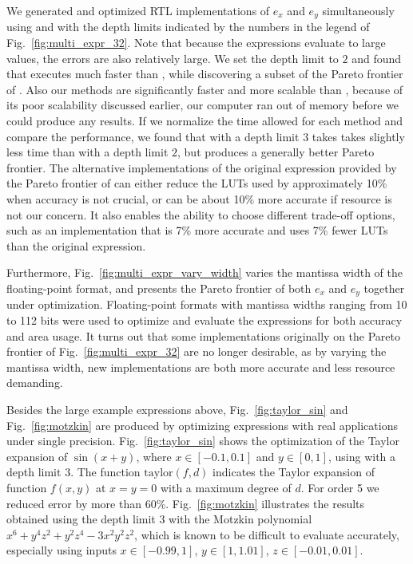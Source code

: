 We generated and optimized RTL implementations of $e_x$ and $e_y$
simultaneously using \frontiertrace{} and \greedytrace{} with the depth limits
indicated by the numbers in the legend of Fig.~\ref{fig:multi_expr_32}. Note
that because the expressions evaluate to large values, the errors are also
relatively large. We set the depth limit to $2$ and found that \greedytrace{}
executes much faster than \frontiertrace{}, while discovering a subset of
the Pareto frontier of \frontiertrace{}. Also our methods are significantly
faster and more scalable than \marteltrace{}, because of its poor scalability
discussed earlier, our computer ran out of memory before we could produce
any results. If we normalize the time allowed for each method and compare
the performance, we found that \greedytrace{} with a depth limit $3$ takes
takes slightly less time than \frontiertrace{} with a depth limit $2$, but
produces a generally better Pareto frontier. The alternative implementations
of the original expression provided by the Pareto frontier of \greedytrace{}
can either reduce the LUTs used by approximately 10\% when accuracy is not
crucial, or can be about 10\% more accurate if resource is not our concern.
It also enables the ability to choose different trade-off options, such as
an implementation that is 7\% more accurate and uses 7\% fewer LUTs than the
original expression.

Furthermore, Fig.~\ref{fig:multi_expr_vary_width} varies the mantissa width of
the floating-point format, and presents the Pareto frontier of both $e_x$ and
$e_y$ together under optimization. Floating-point formats with mantissa widths
ranging from 10 to 112 bits were used to optimize and evaluate the expressions
for both accuracy and area usage. It turns out that some implementations
originally on the Pareto frontier of Fig.~\ref{fig:multi_expr_32} are no longer
desirable, as by varying the mantissa width, new implementations are both more
accurate and less resource demanding.

Besides the large example expressions above, Fig.~\ref{fig:taylor_sin} and
Fig.~\ref{fig:motzkin} are produced by optimizing expressions with real
applications under single precision. Fig.~\ref{fig:taylor_sin} shows the
optimization of the Taylor expansion of $\sin(x + y)$, where $x\in[-0.1, 0.1]$
and $y\in[0, 1]$, using \greedytrace{} with a depth limit $3$. The function
$\mathrm{taylor}(f, d)$ indicates the Taylor expansion of function $f(x, y)$ at
$x = y = 0$ with a maximum degree of $d$. For order 5 we reduced error by more
than 60\%. Fig.~\ref{fig:motzkin} illustrates the results obtained using the
depth limit $3$ with the Motzkin polynomial~\cite{demmel} $x^6 + y^4 z^2 + y^2
z^4 - 3 x^2 y^2 z^2$, which is known to be difficult to evaluate accurately,
especially using inputs $x\in[-0.99, 1]$, $y\in[1, 1.01]$, $z\in[-0.01, 0.01]$.


